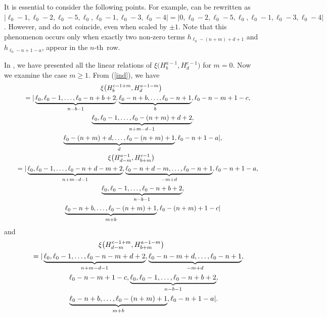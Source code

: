 \documentclass[10pt,a4paper]{amsart}
\numberwithin{equation}{section}
\begin{document}
It is essential to consider the following points. For example,  can be rewritten as $ |\ell_{0}-1,\ell_{0}-2,\ell_{0}-5,\ell_{0},\ell_{0}-1,\ell_{0}-3,\ell_{0}-4|=|0,\ell_{0}-2,\ell_0-5,\ell_{0},\ell_{0}-1,\ell_{0}-3,\ell_{0}-4|$. However,  and  do not coincide, even when scaled by $\pm 1$. Note that this phenomenon occurs only when exactly two non-zero terms $h_{\ell_{0}-(n+m)+d+1}$ and $h_{\ell_{0}-n+1-a}$, appear in the $n$-th~row. %

In \cite{asy3}, we have presented all the linear relations of $\xi\bigl(H^{a-1}_{b},H^{c-1}_{d}\bigr)$ for $m=0$. Now we examine the case $m\geq1$. From (\ref{ind}), we have
\begin{gather}
\xi\bigl(H^{c-1+m}_{b},H^{a-1-m}_{d}\bigr)\nonumber\\
\qquad=|\underbrace{\ell_{0},\ell_{0}-1,\dots,\ell_{0}-n+b+2}_{n-b-1},
\underbrace{\ell_{0}-n+b,\dots,\ell_{0}-n+1}_{b},\ell_{0}-n-m+1-c,\nonumber\\
\qquad\hphantom{=|}{} \underbrace{\ell_{0},\ell_{0}-1,\dots,\ell_{0}-(n+m)+d+2}_{n+m-d-1},\nonumber\\
\qquad\hphantom{=|}{} \underbrace{\ell_{0}-(n+m)+d,\dots,\ell_{0}-(n+m)+1}_{d},\ell_{0}-n+1-a|,\label{ind1}
\\
\xi\bigl(H^{a-1}_{d-m},H^{c-1}_{b+m}\bigr)\nonumber\\
\qquad=|\underbrace{\ell_{0},\ell_{0}-1,\dots,\ell_{0}-n+d-m+2}_{n+m-d-1},
\underbrace{\ell_{0}-n+d-m,\dots,\ell_{0}-n+1}_{-m+d},\ell_{0}-n+1-a,\nonumber\\
\hphantom{\qquad=|}{} \underbrace{\ell_{0},\ell_{0}-1,\dots,\ell_{0}-n+b+2}_{n-b-1},\nonumber\\
\hphantom{\qquad=|}{} \underbrace{\ell_{0}-n+b,\dots,\ell_{0}-(n+m)+1}_{m+b},\ell_{0}-(n+m)+1-c|\label{ind2}
\end{gather}
and
\begin{gather}
\xi\bigl(H^{c-1+m}_{d-m},H^{a-1-m}_{b+m}\bigr)\nonumber\\
\qquad=|\underbrace{\ell_{0},\ell_{0}-1,\dots,\ell_{0}-n-m+d+2}_{n+m-d-1},
\underbrace{\ell_{0}-n-m+d,\dots,\ell_{0}-n+1}_{-m+d},\nonumber\\
\qquad\hphantom{=|}{}\, \ell_{0}-n-m+1-c,\underbrace{\ell_{0},\ell_{0}-1,\dots,\ell_{0}-n+b+2}_{n-b-1},\nonumber\\
\qquad\hphantom{=|}{} \underbrace{\ell_{0}-n+b,\dots,\ell_{0}-(n+m)+1}_{m+b},\ell_{0}-n+1-a|.\label{ind3}
\end{gather}
\end{document}

